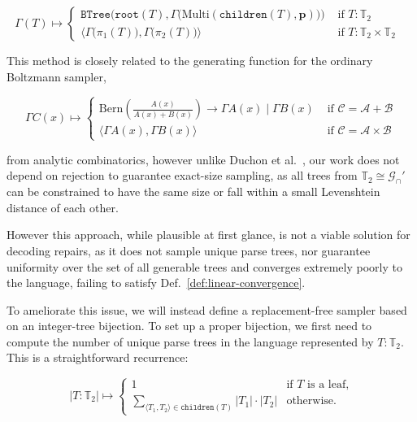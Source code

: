 \documentclass[sigplan,acmsmall,nonacm,screen]{acmart}\settopmatter{printfolios=false,printccs=false,printacmref=false}
\begin{document}
\begin{equation}\label{eq:pcfg_sampler}
  \Gamma(T) \mapsto \begin{cases}
        \texttt{BTree}\Big(\texttt{root}(T), \Gamma\big(\text{Multi}(\texttt{children}(T), \mathbf{p})\big)\Big) & \text{ if $T: \mathbb{T}_2$ } \\
        \big\langle \Gamma\big(\pi_1(T)\big), \Gamma\big(\pi_2(T)\big) \big\rangle & \text{ if $T: \mathbb{T}_2\times\mathbb{T}_2$ }
  \end{cases}
\end{equation}

\noindent This method is closely related to the generating function for the ordinary Boltzmann sampler,

\begin{equation}
  \Gamma C(x) \mapsto \begin{cases}
  \text{Bern} \left(\frac{A(x)}{A(x) + B(x)}\right) \rightarrow \Gamma A(x) \mid \Gamma B(x) & \text{ if } \mathcal{C}=\mathcal{A}+\mathcal{B} \\
  \big\langle \Gamma A(x), \Gamma B(x)\big\rangle & \text{ if } \mathcal{C}=\mathcal{A} \times \mathcal{B}
  \end{cases}
\end{equation}

\noindent from analytic combinatorics, however unlike Duchon et al.~\cite{duchon2004boltzmann}, our work does not depend on rejection to guarantee exact-size sampling, as all trees from $\mathbb{T}_2\cong\mathcal{G}_\cap'$ can be constrained to have the same size or fall within a small Levenshtein distance of each other.

  However this approach, while plausible at first glance, is not a viable solution for decoding repairs, as it does not sample unique parse trees, nor guarantee uniformity over the set of all generable trees and converges extremely poorly to the language, failing to satisfy Def.~\ref{def:linear-convergence}.

  To ameliorate this issue, we will instead define a replacement-free sampler based on an integer-tree bijection. To set up a proper bijection, we first need to compute the number of unique parse trees in the language represented by $T: \mathbb{T}_2$. This is a straightforward recurrence:

\begin{equation}
  |T: \mathbb{T}_2| \mapsto \begin{cases}
    1 & \text{if $T$ is a leaf,} \\
    \sum_{\langle T_1, T_2\rangle \in \texttt{children}(T)} |T_1| \cdot |T_2| & \text{otherwise.}
  \end{cases}
\end{equation}
\end{document}
